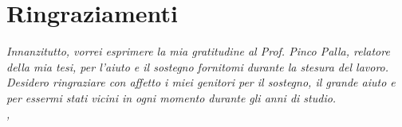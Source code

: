 \cleardoublepage
\thispagestyle{empty}


\begingroup
\let\clearpage\relax
\let\cleardoublepage\relax
\let\cleardoublepage\relax

\section*{Ringraziamenti}
\noindent \textit{Innanzitutto, vorrei esprimere la
mia gratitudine al Prof. Pinco Palla, relatore della
mia tesi, per l'aiuto e il sostegno fornitomi durante la
stesura del lavoro.}\\

\noindent \textit{Desidero ringraziare con affetto i
miei genitori per il sostegno, il grande aiuto e per
essermi stati vicini in ogni momento durante gli anni di
studio.}\\

\bigskip
\noindent\textit{\myLocation, \myTime}
\hfill \myName

\endgroup
